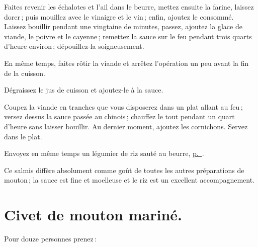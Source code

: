 Faites revenir les échalotes et l'ail dans le beurre, mettez ensuite la farine,
laissez dorer ; puis mouillez avec le vinaigre et le vin ; enfin, ajoutez le
consommé. Laissez bouillir pendant une vingtaine de minutes, passez, ajoutez la
glace de viande, le poivre et le cayenne ; remettez la sauce sur le feu pendant
trois quarts d'heure environ ; dépouillez-la soigneusement.

En même temps, faites rôtir la viande et arrêtez l'opération un peu avant la fin
de la cuisson.

Dégraissez le jus de cuisson et ajoutez-le à la sauce.

Coupez la viande en tranches que vous disposerez dans un plat allant au feu ;
versez dessus la sauce passée au chinois ; chauffez le tout pendant un quart
d'heure sans laisser bouillir. Au dernier moment, ajoutez les cornichons.
Servez dans le plat.

Envoyez en même temps un légumier de riz sauté au beurre,
\hyperlink{p0710}{p. \pageref{pg0710}}.

Ce salmis diffère absolument comme goût de toutes les autres préparations de
mouton ; la sauce est fine et moelleuse et le riz est un excellent
accompagnement.

\section*{\centering Civet de mouton mariné.}
{}

Pour douze personnes prenez :

\medskip

